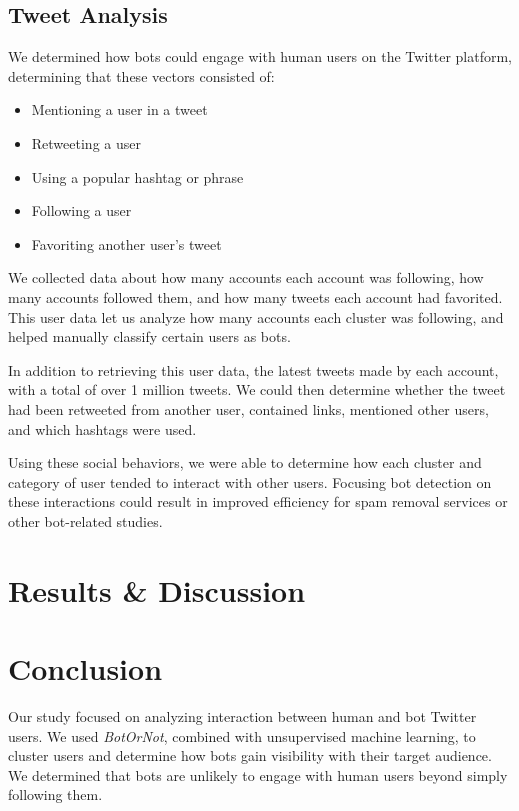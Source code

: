 \documentclass{sig-alternate-05-2015}
\begin{document}
\subsection{Tweet Analysis}

We determined how bots could engage with human users on the Twitter platform, determining that these vectors consisted of:
\begin{itemize}
	\item Mentioning a user in a tweet
	\item Retweeting a user
	\item Using a popular hashtag or phrase
	\item Following a user
	\item Favoriting another user's tweet
\end{itemize}
We collected data about how many accounts each account was following, how many accounts followed them, and how many tweets each account had favorited. This user data let us analyze how many accounts each cluster was following, and helped manually classify certain users as bots.

In addition to retrieving this user data, the latest tweets made by each account, with a total of over 1 million tweets. We could then determine whether the tweet had been retweeted from another user, contained links, mentioned other users, and which hashtags were used.

Using these social behaviors, we were able to determine how each cluster and category of user tended to interact with other users. Focusing bot detection on these interactions could result in improved efficiency for spam removal services or other bot-related studies.

\section{Results \& Discussion}

\section{Conclusion}
Our study focused on analyzing interaction between human and bot Twitter users. We used \emph{BotOrNot}, combined with unsupervised machine learning, to cluster users and determine how bots gain visibility with their target audience. We determined that bots are unlikely to engage with human users beyond simply following them.
\end{document}
